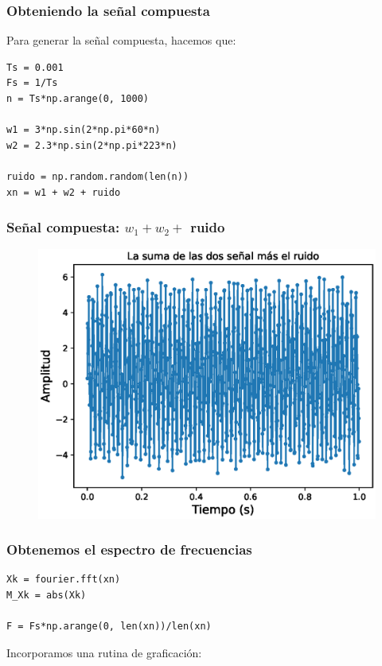 \documentclass[12pt]{beamer}
\begin{document}
\begin{frame}[fragile]
\frametitle{Obteniendo la señal compuesta}
Para generar la señal compuesta, hacemos que:
\begin{lstlisting}
Ts = 0.001
Fs = 1/Ts
n = Ts*np.arange(0, 1000)

w1 = 3*np.sin(2*np.pi*60*n)
w2 = 2.3*np.sin(2*np.pi*223*n)

ruido = np.random.random(len(n))
xn = w1 + w2 + ruido 
\end{lstlisting}
\end{frame}
\begin{frame}
\frametitle{Señal compuesta: $w_{1} + w_{2} +$ ruido}
\begin{figure}
    \centering
    \includegraphics[scale=0.6]{Imagenes/DFT_Analisis_Senal_03.eps}
\end{figure}
\end{frame}
\begin{frame}[fragile]
\frametitle{Obtenemos el espectro de frecuencias}
\begin{lstlisting}
Xk = fourier.fft(xn)
M_Xk = abs(Xk)

F = Fs*np.arange(0, len(xn))/len(xn)
\end{lstlisting}
Incorporamos una rutina de graficación:
\end{frame}
\end{document}
